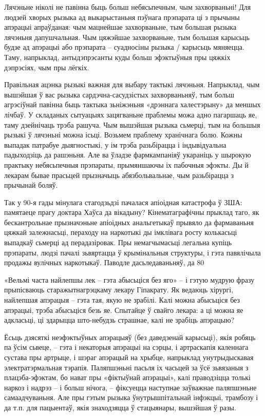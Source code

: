 Лячэньне ніколі не павінна быць больш небясьпечным, чым захворваньні! Для людзей хворых рызыка ад выкарыстаньня пэўнага прэпарата ці з прычыны апэрацыі апраўданая: чым мацнейшае захворваньне, тым большая рызыка лячэньня дапушчальная. Чым цяжэйшае захворваньне, тым большая карысьць будзе ад апэрацыі або прэпарата – суадносіны рызыка / карысьць мяняецца. Таму, напрыклад, антыдэпрэсанты куды больш эфэктыўныя пры цяжкіх дэпрэсіях, чым пры лёгкіх.

Правільная ацэнка рызыкі важная для выбару тактыкі лячэньня. Напрыклад, чым вышэйшая ў вас рызыка сардэчна-сасудзістых захворваньняў, тым больш агрэсіўнай павінна быць тактыка зьніжэньня «дрэннага халестэрыну» да меншых лічбаў. У складаных сытуацыях зацягваньне праблемы можа адно пагаршаць яе, таму дзейнічаць трэба рашуча. Чым вышэйшая рызыка сьмерці, тым на большыя рызыкі ў лячэньні можна ісьці. Возьмем праблему хранічнага болю. Кожны выпадак патрабуе дыягностыкі, у ім трэба разьбірацца і індывідуальна падыходзіць да рашэньня. Але ва ўладзе фармкампаніяў укараніць у шырокую практыку небясьпечныя прэпараты, прымяншаючы іх пабочныя эфэкты. Ды й лекарам бывае прасьцей прызначыць абязбольвальнае, чым разьбірацца з прычынай боляў.

Так у 90-я гады мінулага стагодзьдзі пачалася апіоідная катастрофа ў ЗША: памятаеце прагу доктара Хаўса да вікадыну? Кінематаграфічны прыклад таго, як бескантрольнае прызначэньне апіоідных анальгетыкаў прывяло да фармаваньня цяжкай залежнасьці, пераходу на наркотыкі ды імклівага росту колькасьці выпадкаў сьмерці ад перадазіровак. Пры немагчымасьці легальна купіць прэпараты, людзі пачалі зьвяртацца ў крымінальныя структуры, і гэта павялічыла продажы вулічных наркотыкаў. Паводле дасьледаваньняў, да 80%

«Вельмі часта найлепшы лек – гэта абысьціся без яго» – і гэтую мудрую фразу прыпісваюць старажытнагрэцкаму лекару Гіпакрату. Як ведаюць хірургі, найлепшая апэрацыя – гэта тая, якую не зрабілі. Калі можна абысьціся без апэрацыі, трэба абысьціся безь яе. Спытайце ў свайго лекара: а ці можна яе адкласьці, ці здарыцца што-небудзь страшнае, калі не зрабіць апэрацыю?

Ёсьць дзясяткі неэфэктыўных апэрацыяў (без даведзенай карысьці), якія робяць па ўсім сьвеце, – гэта і некаторыя апэрацыі на сэрцы, і артраскапія каленнага сустава пры артрыце, і шэраг апэрацый на хрыбце, напрыклад унутрыдыскавая электратэрмальная тэрапія. Паляпшэньні пасьля іх часьцей за ўсё зьвязаныя з плацэба-эфэктам, бо нават пры «фіктыўнай апэрацыі», калі праводзіцца толькі наркоз і надрэз – і больш нічога, – фіксуецца наступнае заўважнае паляпшэньне самаадчуваньня. Але пры гэтым рызыка ўнутрышпітальнай інфэкцыі, трамбозу і да т.п. для пацыентаў, якія знаходзяцца ў стацыянары, вышэйшая ў разы.

